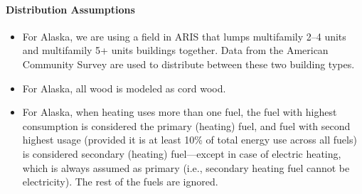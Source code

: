 \paragraph{Distribution Assumptions}
% 
\begin{itemize}
    \item For Alaska, we are using a field in ARIS that lumps multifamily 2--4 units and multifamily 5+ units buildings together. Data from the American Community Survey are used to distribute between these two building types.
    \item For Alaska, all wood is modeled as cord wood.
    \item For Alaska, when heating uses more than one fuel, the fuel with highest consumption is considered the primary (heating) fuel, and fuel with second highest usage (provided it is at least 10\% of total energy use across all fuels) is considered secondary (heating) fuel---except in case of electric heating, which is always assumed as primary (i.e., secondary heating fuel cannot be electricity). The rest of the fuels are ignored.
\end{itemize}
